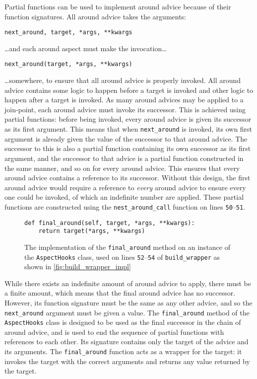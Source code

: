Partial functions can be used to implement around advice because of their
function signatures. All around advice takes the arguments:

{\centering

\lstinline{next_around, target, *args, **kwargs}

}

\ldots{}and each around aspect must make the invocation\ldots{}

{\centering

\lstinline{next_around(target, *args, **kwargs)}

}

\ldots{}somewhere, to ensure that all around advice is properly invoked. All
around advice contains some logic to happen before a target is invoked and other
logic to happen after a target is invoked. As many around advices may be applied
to a join-point, each around advice must invoke its successor. This is achieved
using partial functions: before being invoked, every around advice is given its
successor as its first argument. This means that when \lstinline{next_around} is
invoked, its own first argument is already given the value of the successor to
that around advice. The successor to this is also a partial function containing
its own successor as its first argument, and the successor to that advice is a
partial function constructed in the same manner, and so on for every around
advice. This ensures that every around advice contains a reference to its
successor. Without this design, the first around advice would require a
reference to \emph{every} around advice to ensure every one could be invoked, of
which an indefinite number are applied. These partial functions are constructed
using the \lstinline{nest_around_call} function on lines
\texttt{50}--\texttt{51}.

\begin{figure}
    \begin{lstlisting}
def final_around(self, target, *args, **kwargs):
    return target(*args, **kwargs)
    \end{lstlisting}
    \caption{The implementation of the \lstinline{final_around} method on an
    instance of the \lstinline{AspectHooks} class, used on lines
    \texttt{52}--\texttt{54} of \lstinline{build_wrapper} as shown in \cref{fig:build_wrapper_impl}}
    \label{fig:final_around_impl}
\end{figure}


While there exists an indefinite amount of around advice to apply, there must be
a finite amount, which means that the final around advice has no successor.
However, its function signature must be the same as any other advice, and so the
\lstinline{next_around} argument must be given a value. The
\lstinline{final_around} method of the \lstinline{AspectHooks} class is designed
to be used as the final successor in the chain of around advice, and is used to
end the sequence of partial functions with references to each other. Its
signature contains only the target of the advice and its arguments. The
\lstinline{final_around} function acts as a wrapper for the target: it invokes
the target with the correct arguments and returns any value returned by the
target. 

